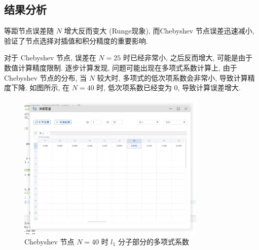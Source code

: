 \documentclass[12pt]{article}
\begin{document}
		\subsection{结果分析}
			等距节点误差随 $N$ 增大反而变大 (Runge现象), 而Chebyshev 节点误差迅速减小, 验证了节点选择对插值和积分精度的重要影响.

			对于 Chebyshev 节点, 误差在 $N=25$ 时已经非常小, 之后反而增大, 可能是由于数值计算精度限制. 逐步计算发现, 问题可能出现在多项式系数计算上, 由于 Chebyshev 节点的分布, 当 $N$ 较大时, 多项式的低次项系数会非常小, 导致计算精度下降. 如图所示, 在 $N=40$ 时, 低次项系数已经变为 0, 导致计算误差增大.

			\begin{figure}[htbp]
				\centering
				\includegraphics[width=0.8\textwidth]{figure/poly_coeffs.png}
				\caption{Chebyshev 节点 $N=40$ 时 $l_{1}$ 分子部分的多项式系数}
				\label{fig:poly_coeffs}
			\end{figure}
\end{document}
